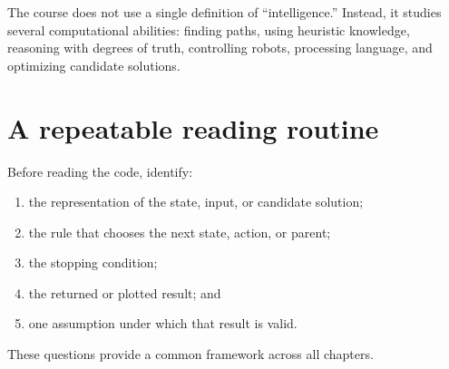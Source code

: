 \begin{mlfigure}
\end{mlfigure}

\begin{keyidea}
The course does not use a single definition of ``intelligence.'' Instead, it studies several computational abilities: finding paths, using heuristic knowledge, reasoning with degrees of truth, controlling robots, processing language, and optimizing candidate solutions.
\end{keyidea}


\section*{A repeatable reading routine}

Before reading the code, identify:
\begin{enumerate}
  \item the representation of the state, input, or candidate solution;
  \item the rule that chooses the next state, action, or parent;
  \item the stopping condition;
  \item the returned or plotted result; and
  \item one assumption under which that result is valid.
\end{enumerate}
These questions provide a common framework across all chapters.
